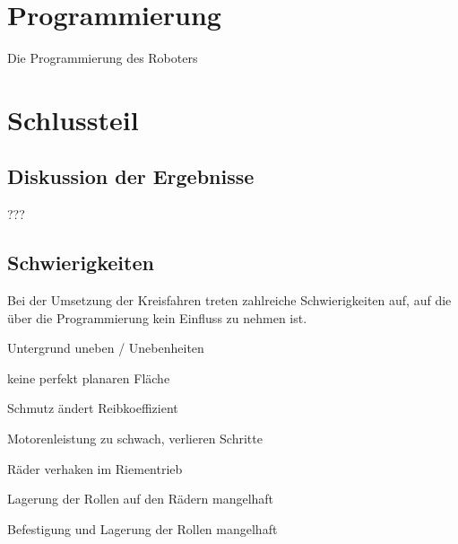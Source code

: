 \documentclass[a4paper]{article}
\begin{document}
\section{Programmierung}
Die Programmierung des Roboters


\section{Schlussteil}
\subsection{Diskussion der Ergebnisse}
???

\subsection{Schwierigkeiten}
Bei der Umsetzung der Kreisfahren treten zahlreiche Schwierigkeiten auf, auf die über die Programmierung kein Einfluss zu nehmen ist.
\begin{compactitem}
    \item Untergrund uneben / Unebenheiten
    \item keine perfekt planaren Fläche
    \item Schmutz ändert Reibkoeffizient
    \item Motorenleistung zu schwach, verlieren Schritte
    \item Räder verhaken im Riementrieb
    \item Lagerung der Rollen auf den Rädern mangelhaft
    \item Befestigung und Lagerung der Rollen mangelhaft
\end{compactitem}
\end{document}
